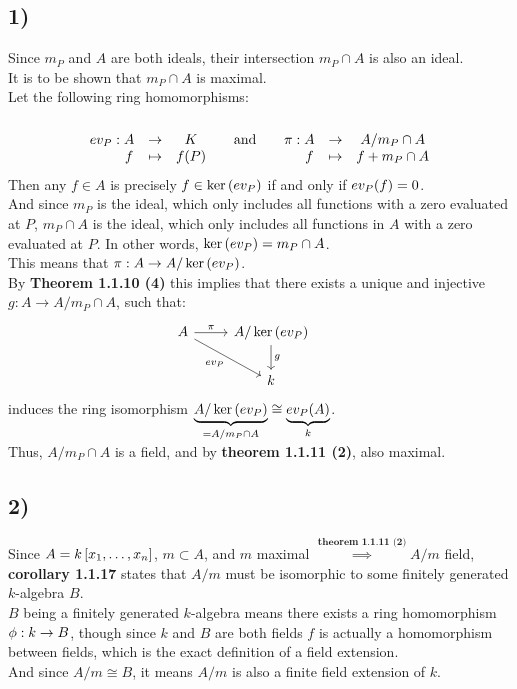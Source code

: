 \documentclass[a4paper]{scrartcl}
\begin{document}
\subsection*{1)}
Since $m_P$ and $A$ are both ideals, their intersection $m_P\cap A$ is also an ideal.\\
It is to be shown that $m_P\cap A$ is maximal.\\
Let the following ring homomorphisms:
\[ev_P:\begin{matrix}
    \\
    A&\rightarrow& K\\
    f&\mapsto&f{\left( P \right)}
\end{matrix}\qquad\text{and}\qquad \pi:\begin{matrix}
    \\
    A&\rightarrow& A/m_P\cap A\\
    f&\mapsto&f+m_P\cap A
\end{matrix}\]
Then any $f\in A$ is precisely $f\in\ker{\left( ev_P \right)}$ if and only if $ev_P{\left( f \right)}=0$.\\
And since $m_P$ is the ideal, which only includes all functions with a zero evaluated at $P$, $m_P\cap A$ is the ideal, which only includes all functions in $A$ with a zero evaluated at $P$. In other words, $\ker{\left( ev_P \right)}=m_P\cap A$.\\
This means that $\pi:A\rightarrow A/\ker{\left( ev_P \right)}$.\\
By \textbf{Theorem 1.1.10 (4)} this implies that there exists a unique and injective $g:A\rightarrow A/m_P\cap A$, such that:
\[\begin{tikzcd}
    A \arrow{r}{\pi} \arrow[swap]{dr}{ev_P} & A/\ker\of{ev_P} \arrow{d}{g}\\
    & k &
\end{tikzcd}\]
induces the ring isomorphism $\underbrace{A/\ker{\left( ev_P \right)}}_{=A/m_P\cap A}\cong \underbrace{ev_P{\left( A \right)}}_{k}$.\\
Thus, $A/m_P\cap A$ is a field, and by \textbf{theorem 1.1.11 (2)}, also maximal.
\subsection*{2)}
Since $A=k\left[ x_1,\dots,x_n \right]$, $m\subset A$, and $m$ maximal $\overset{\textbf{theorem 1.1.11 (2)}}{\implies} A/m$ field, \textbf{corollary 1.1.17} states that $A/m$ must be isomorphic to some finitely generated $k$-algebra $B$.\\
$B$ being a finitely generated $k$-algebra means there exists a ring homomorphism $\phi:k\rightarrow B$, though since $k$ and $B$ are both fields $f$ is actually a homomorphism between fields, which is the exact definition of a field extension.\\
And since $A/m\cong B$, it means $A/m$ is also a finite field extension of $k$.
\end{document}
